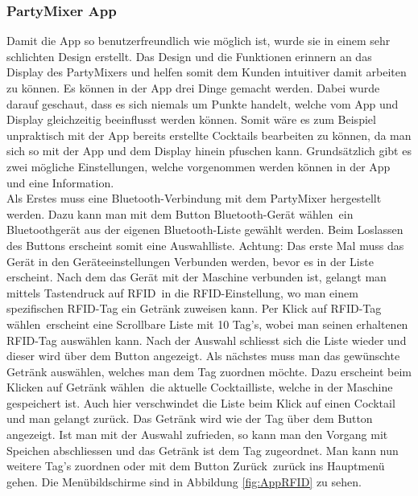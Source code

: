 \subsubsection{PartyMixer App}
\label{subsubsec:Software_PartyMixer_App}

Damit die App so benutzerfreundlich wie möglich ist, wurde sie in einem sehr schlichten Design erstellt. Das Design und die Funktionen erinnern an das Display des PartyMixers und helfen somit dem Kunden intuitiver damit arbeiten zu können. Es können in der App drei Dinge gemacht werden. Dabei wurde darauf geschaut, dass es sich niemals um Punkte handelt, welche vom App und Display gleichzeitig beeinflusst werden können. Somit wäre es zum Beispiel unpraktisch mit der App bereits erstellte Cocktails bearbeiten zu können, da man sich so mit der App und dem Display hinein pfuschen kann. Grundsätzlich gibt es zwei mögliche Einstellungen, welche vorgenommen werden können in der App und eine Information.\\ 

Als Erstes muss eine Bluetooth-Verbindung mit dem PartyMixer hergestellt werden. Dazu kann man mit dem Button \flqq Bluetooth-Gerät wählen\frqq~ein Bluetoothgerät aus der eigenen Bluetooth-Liste gewählt werden. Beim Loslassen des Buttons erscheint somit eine Auswahlliste. Achtung: Das erste Mal muss das Gerät in den Geräteeinstellungen Verbunden werden, bevor es in der Liste erscheint. Nach dem das Gerät mit der Maschine verbunden ist, gelangt man mittels Tastendruck auf \flqq RFID\frqq~in die RFID-Einstellung, wo man einem spezifischen RFID-Tag ein Getränk zuweisen kann. Per Klick auf \flqq RFID-Tag wählen\frqq~erscheint eine Scrollbare Liste mit 10 Tag's, wobei man seinen erhaltenen RFID-Tag auswählen kann. Nach der Auswahl schliesst sich die Liste wieder und dieser wird über dem Button angezeigt. Als nächstes muss man das gewünschte Getränk auswählen, welches man dem Tag zuordnen möchte. Dazu erscheint beim Klicken auf \flqq Getränk wählen\frqq~die aktuelle Cocktailliste, welche in der Maschine gespeichert ist. Auch hier verschwindet die Liste beim Klick auf einen Cocktail und man gelangt zurück. Das Getränk wird wie der Tag über dem Button angezeigt. Ist man mit der Auswahl zufrieden, so kann man den Vorgang mit Speichen abschliessen und das Getränk ist dem Tag zugeordnet. Man kann nun weitere Tag's zuordnen oder mit dem Button \flqq Zurück\frqq~zurück ins Hauptmenü gehen.
Die Menübildschirme sind in Abbildung \ref{fig:AppRFID} zu sehen.\\

